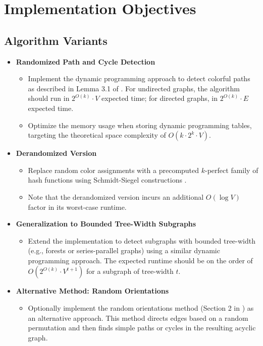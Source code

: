 \section{Implementation Objectives}
\subsection{Algorithm Variants}
\begin{itemize}
    \item \textbf{Randomized Path and Cycle Detection}
    \begin{itemize}
        \item Implement the dynamic programming approach to detect colorful paths as described in Lemma 3.1 of \cite{alon1995color}. For undirected graphs, the algorithm should run in \(2^{O(k)} \cdot V\) expected time; for directed graphs, in \(2^{O(k)} \cdot E\) expected time.
        \item Optimize the memory usage when storing dynamic programming tables, targeting the theoretical space complexity of \(O(k \cdot 2^k \cdot V)\).
    \end{itemize}
    \item \textbf{Derandomized Version}
    \begin{itemize}
        \item Replace random color assignments with a precomputed \(k\)-perfect family of hash functions using Schmidt-Siegel constructions \cite{schmidt1990spatial}. 
        \item Note that the derandomized version incurs an additional \(O(\log V)\) factor in its worst-case runtime.
    \end{itemize}
    \item \textbf{Generalization to Bounded Tree-Width Subgraphs}
    \begin{itemize}
        \item Extend the implementation to detect subgraphs with bounded tree-width (e.g., forests or series-parallel graphs) using a similar dynamic programming approach. The expected runtime should be on the order of \(O(2^{O(k)}\cdot V^{t+1})\) for a subgraph of tree-width \(t\).
    \end{itemize}
    \item \textbf{Alternative Method: Random Orientations}
    \begin{itemize}
        \item Optionally implement the random orientations method (Section 2 in \cite{alon1995color}) as an alternative approach. This method directs edges based on a random permutation and then finds simple paths or cycles in the resulting acyclic graph.
    \end{itemize}
\end{itemize}

